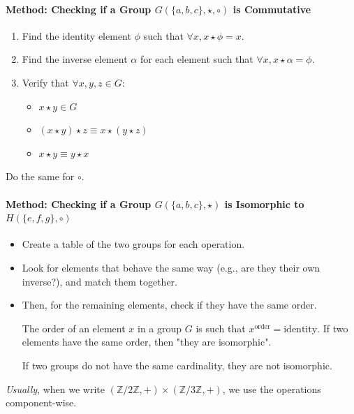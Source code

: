 \documentclass{article}
\begin{document}
\paragraph{Method: Checking if a Group \( G(\{a, b, c\}, \star, \circ) \) is Commutative}

\begin{enumerate}
    \item Find the identity element \( \phi \) such that \( \forall x, x \star \phi = x \).
    \item Find the inverse element \( \alpha \) for each element such that \( \forall x, x \star \alpha = \phi \).
    \item Verify that \( \forall x, y, z \in G \):
    \begin{itemize}
        \item \( x \star y \in G \)
        \item \( (x \star y) \star z \equiv x \star (y \star z) \)
        \item \( x \star y \equiv y \star x \)
    \end{itemize}
\end{enumerate}

Do the same for \( \circ \).

\paragraph{Method: Checking if a Group \( G(\{a, b, c\}, \star) \) is Isomorphic to \( H(\{e, f, g\}, \circ) \)}

\begin{itemize}
    \item Create a table of the two groups for each operation.
    \item Look for elements that behave the same way (e.g., are they their own inverse?), and match them together.
    \item Then, for the remaining elements, check if they have the same order.

    The order of an element \( x \) in a group \( G \) is such that \( x^{\text{order}} = \text{identity} \). If two elements have the same order, then "they are isomorphic".

    If two groups do not have the same cardinality, they are not isomorphic.
\end{itemize}
\textit{Usually}, when we write \( (\mathbb{Z}/2\mathbb{Z}, +) \times (\mathbb{Z}/3\mathbb{Z}, +) \), we use the operations component-wise.

\newpage
\end{document}
